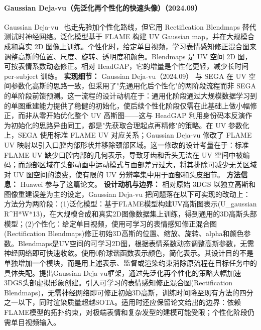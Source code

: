 \paragraph{Gaussian Deja-vu（先泛化再个性化的快速头像）（2024.09）}
Gaussian Deja-vu~\cite{2409_16147} 也走先验加个性化路线，但它用 Rectification Blendmaps 替代测试时神经网络。泛化模型基于 FLAME 构建 UV Gaussian map，并在大规模合成和真实 2D 图像上训练。个性化时，给定单目视频，学习表情感知修正混合图来调整高斯的位置、尺度、旋转、透明度和颜色。Blendmaps 是 UV 空间 2D 图，可按表情系数动态修正。相对 HeadGAP，它的增量是个性化更轻，减少长时间 per-subject 训练。
\textbf{实现细节：} Gaussian Deja-vu（2024.09） 与 SEGA 在 UV 空间参数化高斯的思路一致，但采用了"先通用化后个性化"的两阶段流程而非 SEGA 的单阶段前馈预测。这一流程的设计动机在于：通用化阶段通过大规模数据学习到的单图重建能力提供了稳健的初始化，使后续个性化阶段仅需在此基础上做小幅修正，而非从零开始优化整个 UV 高斯图——这与 HeadGAP 利用身份码本反演作为初始化的思路异曲同工，都是"先获取合理起点再精修"的策略。在 UV 参数化上，SEGA 使用标准 FLAME UV 对应关系；Gaussian Deja-vu 修改了 FLAME UV 映射以引入口腔内部形状并移除颈部区域。这一修改的设计考量在于：标准 FLAME UV 缺少口腔内部的几何表示，导致牙齿和舌头无法在 UV 空间中被编码；而颈部区域在头部动画中运动模式与面部差异过大，将其排除可减少无关区域对 UV 图空间的浪费，使有限的 UV 分辨率集中用于面部和头皮细节。
\textbf{方法信息：} Huawei 参与了这篇论文。
\textbf{设计动机与边界：} 相对原始 3DGS 以独立高斯和图像重建误差为主的设定，Gaussian Deja-vu 把问题落在以下可实现的改动上：方法分为两阶段：(1)泛化模型：基于FLAME模型构建UV高斯图表示(U\_gaussian R\^{}{H*W*13})，在大规模合成和真实2D图像数据集上训练，得到通用的3D高斯头部模型；(2)个性化：给定单目视频，使用可学习的表情感知修正混合图(Rectification Blendmaps)修正初始3D高斯的位置、缩放、旋转、alpha和颜色参数。Blendmaps是UV空间的可学习2D图，根据表情系数动态调整高斯参数，无需神经网络即可快速收敛。使用0阶球谐函数表示颜色，简化表示。其设计目的不是单独增加一个模块，而是用上述表示、监督或渲染约束消除原流程在目标任务中的具体失配。提出Gaussian Deja-vu框架，通过先泛化再个性化的策略大幅加速3DGS头部虚拟形象创建。引入可学习的表情感知修正混合图(Rectification Blendmaps)，无需神经网络即可修正初始3D高斯，训练时间降至现有方法的四分之一以下，同时渲染质量超越SOTA。适用时还应保留论文给出的边界：依赖FLAME模型的拓扑约束，对极端表情和复杂发型的建模可能受限；个性化阶段仍需单目视频输入。
